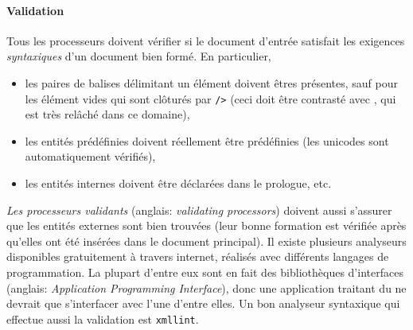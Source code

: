 \paragraph{Validation}

Tous les processeurs \XML doivent vérifier si le document d'entrée
satisfait les exigences \emph{syntaxiques} d'un document \XML bien
formé. En particulier,
\begin{itemize}

  \item les paires de balises délimitant un élément doivent êtres
    présentes, sauf pour les élément vides qui sont clôturés par
    \texttt{/>} (ceci doit être contrasté avec \HTML, qui est très
    relâché dans ce domaine),

  \item les entités prédéfinies doivent réellement être prédéfinies
    (les unicodes sont automatiquement vérifiés),

  \item les entités internes doivent être déclarées dans le prologue,
    etc.

\end{itemize}
\emph{Les processeurs validants} (anglais: \emph{validating
  processors}) doivent aussi s'assurer que les entités externes sont
bien trouvées (leur bonne formation est vérifiée après qu'elles ont
été insérées dans le document principal). Il existe plusieurs
analyseurs \XML disponibles gratuitement à travers internet, réalisés
avec différents langages de programmation. La plupart d'entre eux sont
en fait des bibliothèques d'interfaces (anglais: \emph{Application
  Programming Interface}), donc une application traitant du \XML ne
devrait que s'interfacer avec l'une d'entre elles. Un bon analyseur
syntaxique qui effectue aussi la validation est \texttt{xmllint}.

\mypar{\HTML}

